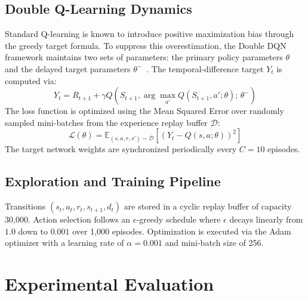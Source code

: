 \documentclass[runningheads]{llncs}
\begin{document}
\subsection{Double Q-Learning Dynamics}
Standard Q-learning is known to introduce positive maximization bias through the greedy target formula. To suppress this overestimation, the Double DQN framework maintains two sets of parameters: the primary policy parameters $\theta$ and the delayed target parameters $\theta^-$~\cite{vanhasselt2016deep}. The temporal-difference target $Y_t$ is computed via:
\begin{equation}
Y_t = R_{t+1} + \gamma Q\left(S_{t+1}, \arg\max_{a'} Q(S_{t+1}, a'; \theta);\, \theta^-\right)
\end{equation}
The loss function is optimized using the Mean Squared Error over randomly sampled mini-batches from the experience replay buffer $\mathcal{D}$:
\begin{equation}
\mathcal{L}(\theta) = \mathbb{E}_{(s, a, r, s') \sim \mathcal{D}} \left[ \left( Y_t - Q(s, a; \theta) \right)^2 \right]
\end{equation}
The target network weights are synchronized periodically every $C = 10$ episodes.

\subsection{Exploration and Training Pipeline}
Transitions $(s_t, a_t, r_t, s_{t+1}, d_t)$ are stored in a cyclic replay buffer of capacity 30,000. Action selection follows an $\epsilon$-greedy schedule where $\epsilon$ decays linearly from $1.0$ down to $0.001$ over 1,000 episodes. Optimization is executed via the Adam optimizer with a learning rate of $\alpha = 0.001$ and mini-batch size of 256.

\section{Experimental Evaluation}
\end{document}
